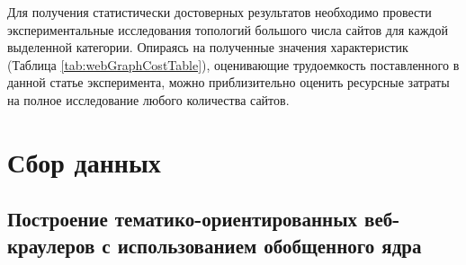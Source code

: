 Для получения статистически достоверных результатов необходимо провести экспериментальные исследования топологий большого числа сайтов для каждой выделенной категории. Опираясь на полученные значения характеристик (Таблица \cref{tab:webGraphCostTable}), оценивающие трудоемкость поставленного в данной статье эксперимента, можно приблизительно оценить ресурсные затраты на полное исследование любого количества сайтов.

\section{Сбор данных}\label{sec:ch1/sec3}


\subsection{Построение тематико-ориентированных веб-краулеров с использованием обобщенного ядра}\label{subsec:ch1/sec3/sub1}

%
%
%
%
%

